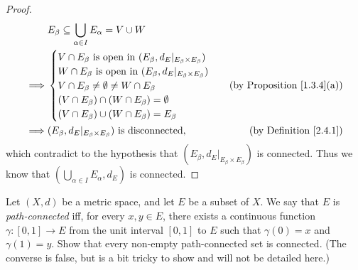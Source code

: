\begin{proof}
    \begin{align*}
                 & E_\beta \subseteq \bigcup_{\alpha \in I} E_\alpha = V \cup W                                               \\
        \implies & \begin{cases}
            V \cap E_\beta \text{ is open in } (E_\beta, d_E|_{E_\beta \times E_\beta}) \\
            W \cap E_\beta \text{ is open in } (E_\beta, d_E|_{E_\beta \times E_\beta}) \\
            V \cap E_\beta \neq \emptyset \neq W \cap E_\beta                           \\
            (V \cap E_\beta) \cap (W \cap E_\beta) = \emptyset                          \\
            (V \cap E_\beta) \cup (W \cap E_\beta) = E_\beta
        \end{cases}                                        & \text{(by Proposition \ref{1.3.4}(a))} \\
        \implies & (E_\beta, d_E|_{E_\beta \times E_\beta}) \text{ is disconnected}, & \text{(by Definition \ref{2.4.1})}
    \end{align*}
    which contradict to the hypothesis that \((E_\beta, d_E|_{E_\beta \times E_\beta})\) is connected.
    Thus we know that \((\bigcup_{\alpha \in I} E_\alpha, d_E)\) is connected.
\end{proof}

\begin{exercise}\label{ex 2.4.7}
    Let \((X, d)\) be a metric space, and let \(E\) be a subset of \(X\).
    We say that \(E\) is \emph{path-connected} iff, for every \(x, y \in E\), there exists a continuous function \(\gamma : [0, 1] \to E\) from the unit interval \([0, 1]\) to \(E\) such that \(\gamma(0) = x\) and \(\gamma(1) = y\).
    Show that every non-empty path-connected set is connected.
    (The converse is false, but is a bit tricky to show and will not be detailed here.)
\end{exercise}

